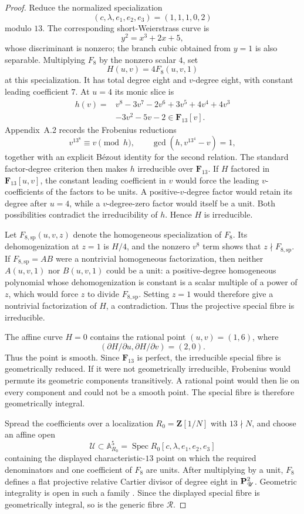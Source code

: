 \begin{proof}
Reduce the normalized specialization
\[
 (c,\lambda,e_1,e_2,e_3)=(1,1,1,0,2)
\]
modulo $13$.  The corresponding short-Weierstrass curve is
\[
 y^2=x^3+2x+5,
\]
whose discriminant is nonzero; the branch cubic obtained from $y=1$ is also
separable.  Multiplying $F_8$ by the nonzero scalar $4$, set
\[
 H(u,v)=4F_8(u,v,1)
\]
at this specialization.  It has total degree eight and $v$-degree eight,
with constant leading coefficient $7$.  At $u=4$ its monic slice is
\[
 \begin{aligned}
 h(v)={}&v^8-3v^7-2v^6+3v^5+4v^4+4v^3\\
       &-3v^2-5v-2\in\mathbf F_{13}[v].
 \end{aligned}
\]
Appendix~A.2 records the Frobenius reductions
\[
 v^{13^8}\equiv v\pmod h,
 \qquad
 \gcd(h,v^{13^4}-v)=1,
\]
together with an explicit B\'ezout identity for the second relation.  The
standard factor-degree criterion then makes $h$ irreducible over
$\mathbf F_{13}$.
If $H$ factored in $\mathbf F_{13}[u,v]$, the constant leading coefficient in
$v$ would force the leading $v$-coefficients of the factors to be units.  A
positive-$v$-degree factor would retain its degree after $u=4$, while a
$v$-degree-zero factor would itself be a unit.  Both possibilities contradict
the irreducibility of $h$.  Hence $H$ is irreducible.

Let $F_{8,\mathrm{sp}}(u,v,z)$ denote the homogeneous specialization of
$F_8$.  Its dehomogenization at $z=1$ is $H/4$, and the nonzero $v^8$ term
shows that $z\nmid F_{8,\mathrm{sp}}$.  If
$F_{8,\mathrm{sp}}=AB$ were a nontrivial homogeneous factorization, then
neither $A(u,v,1)$ nor $B(u,v,1)$ could be a unit: a positive-degree
homogeneous polynomial whose dehomogenization is constant is a scalar
multiple of a power of $z$, which would force $z$ to divide
$F_{8,\mathrm{sp}}$.  Setting $z=1$ would therefore give a nontrivial
factorization of $H$, a contradiction.  Thus the projective special fibre is
irreducible.

The affine curve $H=0$ contains the rational point $(u,v)=(1,6)$, where
\[
 (\partial H/\partial u,\partial H/\partial v)=(2,0).
\]
Thus the point is smooth.  Since $\mathbf F_{13}$ is perfect, the irreducible
special fibre is geometrically reduced.  If it were not geometrically
irreducible, Frobenius would permute its geometric components transitively.
A rational point would then lie on every component and could not be a smooth
point.  The special fibre is therefore geometrically integral.

Spread the coefficients over a localization $R_0=\mathbf Z[1/N]$ with
$13\nmid N$, and choose an affine open
\[
 \mathscr U\subset\mathbb A^5_{R_0}
 =\operatorname{Spec}R_0[c,\lambda,e_1,e_2,e_3]
\]
containing the displayed characteristic-$13$ point on which the required
denominators and one coefficient of $F_8$ are units.  After multiplying by a
unit, $F_8$ defines a flat projective relative Cartier divisor of degree eight
in $\mathbf P^2_{\mathscr U}$.  Geometric integrality is open in such a family
\cite[IV$_3$, Th\'eor\`eme~12.2.4\textup{(viii)}]{EGA4}.  Since the displayed
special fibre is geometrically integral, so is the generic fibre
$\mathscr R$.
\end{proof}

